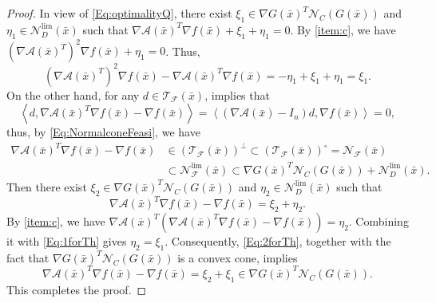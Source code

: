 \documentclass[11pt,a4paper,reqno]{amsart}
\begin{document}
{\begin{proof}
In view of \eqref{Eq:optimalityQ}, there exist $\xi_1\in \nabla G(\bar x)^T\mathcal N_C(G(\bar x))$ and $\eta_1 \in \mathcal N_D^{\text{lim}}(\bar x)$ such that
    $\nabla \mathcal A(\bar x)^T \nabla f(\bar x)+\xi_1+\eta_1=0$.
By  \ref{item:c}, we have $
    \left( \nabla \mathcal A(\bar x)^T\right)^2 \nabla f(\bar x)+\eta_1=0$.
Thus,
\begin{equation}\label{Eq:1forTh}
    \left( \nabla \mathcal A(\bar x)^T\right)^2 \nabla f(\bar x) -\nabla \mathcal A(\bar x)^T \nabla f(\bar x) = -\eta_1+\xi_1+\eta_1 = \xi_1.
\end{equation}
On the other hand, for any $d\in \mathcal T_{\mathcal F}(\bar x)$,  implies that
\begin{equation*}
    \left< d,  \nabla \mathcal A (\bar x)^T \nabla f(\bar x)-\nabla f(\bar x) \right> = \left<\left(\nabla \mathcal A(\bar x)-I_n \right)d, \nabla f(\bar x) \right>=0,
\end{equation*}
thus, by \eqref{Eq:NormalconeFeasi}, we have
\begin{equation*}
\begin{aligned}
    \nabla \mathcal A (\bar x)^T \nabla f(\bar x)-\nabla f(\bar x) &\in (\mathcal T_{\mathcal F}(\bar x))^{\perp} \subset (\mathcal T_{\mathcal F}(\bar x))^{\circ} =\mathcal N_{\mathcal F}(\bar x)\\
    & \subset \mathcal N^{\text{lim}}_{\mathcal F}(\bar x) \subset \nabla G(\bar x)^T \mathcal N_C (G(\bar x))+\mathcal N_D^{\text{lim}}(\bar x).
    \end{aligned}
\end{equation*}
Then there exist $\xi_2\in \nabla G(\bar x)^T \mathcal N_C (G(\bar x))$ and $\eta_2 \in \mathcal N_D^{\text{lim}}(\bar x)$ such that
\begin{equation}\label{Eq:2forTh}
    \nabla \mathcal A (\bar x)^T \nabla f(\bar x)-\nabla f(\bar x) = \xi_2+\eta_2.
\end{equation}
By  \ref{item:c}, we have
   $\nabla \mathcal A (\bar x)^T \left( \nabla \mathcal A (\bar x)^T \nabla f(\bar x)-\nabla f(\bar x) \right) = \eta_2$.
Combining it with \eqref{Eq:1forTh} gives $\eta_2=\xi_1$. Consequently, \eqref{Eq:2forTh}, together with the fact that $\nabla G(\bar x)^T \mathcal N_C(G(\bar x))$ is a convex cone, implies
\begin{equation*}
 \nabla \mathcal A (\bar x)^T \nabla f(\bar x)-\nabla f(\bar x)=\xi_2+\xi_1 \in \nabla G(\bar x)^T \mathcal N_C (G(\bar x)).
\end{equation*}
This completes the proof.
 \end{proof}
 
}
\end{document}
